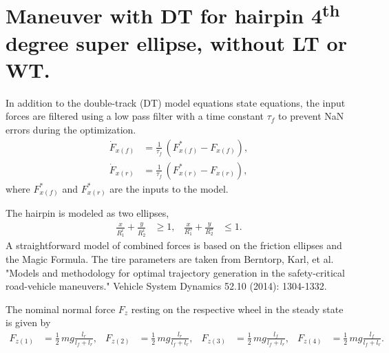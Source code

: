 \chapter[Double-Track Maneuver Optimization]{Maneuver with DT for hairpin 4\textsuperscript{th} degree super ellipse, without LT or WT.}

In addition to the double-track (DT) model equations state equations,
the input forces are filtered using a low pass filter with a time constant $\tau_f$ to prevent NaN errors during the optimization.
\begin{align}
    \dot F_{x(f)} &= \frac{1}{\tau_f}\,\left(F_{x(f)}^* - F_{x(f)}\right),\\
    \dot F_{x(r)} &= \frac{1}{\tau_f}\,\left(F_{x(r)}^* - F_{x(r)}\right),
\end{align}
where $F_{x(f)}^*$ and $F_{x(r)}^*$ are the inputs to the model.

The hairpin is modeled as two ellipses,
\begin{align}
    \frac{x}{R_1^i} + \frac{y}{R_2^i} & \geq 1, & \frac{x}{R_1^o} + \frac{y}{R_2^o} & \leq 1.
\end{align}
A straightforward model of combined forces is based on the friction ellipses and the Magic Formula. The tire parameters are taken from Berntorp, Karl, et al. "Models and methodology for optimal trajectory generation in the safety-critical road-vehicle maneuvers." Vehicle System Dynamics 52.10 (2014): 1304-1332.

The nominal normal force $F_z$ resting on the respective wheel in the steady state is given by
\begin{align}
    F_{z(1)} &= \frac{1}{2}\,mg\frac{l_r}{l_f+l_r}, & F_{z(2)} &= \frac{1}{2}\,mg\frac{l_r}{l_f+l_r}, & F_{z(3)} &= \frac{1}{2}\,mg\frac{l_f}{l_f+l_r}, & F_{z(4)} &= \frac{1}{2}\,mg\frac{l_f}{l_f+l_r}. \label{eq:prob2_maxforce_DT}
\end{align}

